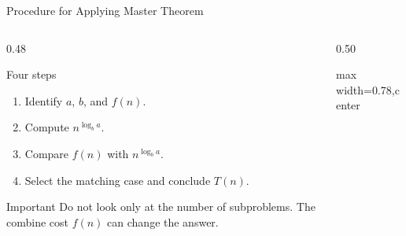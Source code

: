 \documentclass[aspectratio=169]{beamer}
\begin{document}
\begin{frame}{Procedure for Applying Master Theorem}
  \begin{columns}[T]
    \begin{column}{0.48\textwidth}
      \begin{block}{Four steps}
        \small
        \begin{enumerate}
          \item Identify $a$, $b$, and $f(n)$.
          \item Compute $n^{\log_b a}$.
          \item Compare $f(n)$ with $n^{\log_b a}$.
          \item Select the matching case and conclude $T(n)$.
        \end{enumerate}
      \end{block}
      \begin{alertblock}{Important}
        \small
        Do not look only at the number of subproblems. The combine cost $f(n)$ can change the answer.
      \end{alertblock}
    \end{column}
    \begin{column}{0.50\textwidth}
      \begin{center}
        \begin{adjustbox}{max width=0.78\linewidth,center}
        \end{adjustbox}
      \end{center}
    \end{column}
  \end{columns}
\end{frame}
\end{document}
